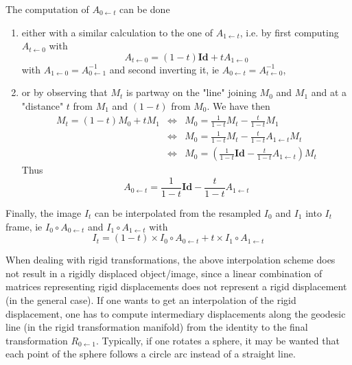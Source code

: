 The computation of $A_{0\leftarrow t}$ can be done 
\begin{enumerate}
\item either with a similar calculation to the one of 
$A_{1 \leftarrow t}$, i.e.
by first computing $A_{t \leftarrow 0}$ with
\begin{displaymath}
A_{t \leftarrow 0} = (1-t) \mathbf{Id} + t A_{1 \leftarrow 0} 
\end{displaymath}
with $A_{1 \leftarrow 0} = A_{0 \leftarrow 1}^{-1}$ and second inverting it, ie $A_{0\leftarrow t} = A_{t \leftarrow 0}^{-1}$,

\item or by observing that
$M_t$ is partway on the "line" joining $M_0$ and $M_1$ and at a "distance" $t$   from $M_1$ and $(1-t)$ from $M_0$. 
We have then
\begin{eqnarray*}
M_t =  (1-t) M_0 + t M_1 
& \Leftrightarrow &
 M_0 = \frac{1}{1-t} M_t - \frac{t}{1-t} M_1 \\
& \Leftrightarrow &
 M_0
 = \frac{1}{1-t} M_t - \frac{t}{1-t} A_{1\leftarrow t} M_t \\
 & \Leftrightarrow &
 M_0
 = \left( \frac{1}{1-t} \mathbf{Id} 
- \frac{t}{1-t} A_{1 \leftarrow t} \right) M_t
\end{eqnarray*}
Thus
\begin{displaymath}
A_{0 \leftarrow t} =  \frac{1}{1-t} \mathbf{Id} 
- \frac{t}{1-t} A_{1 \leftarrow t}
\end{displaymath}

\end{enumerate}


Finally, the image $I_t$ can be interpolated from the resampled $I_0$ and $I_1$ into $I_t$ frame, ie $I_0 \circ A_{0 \leftarrow t}$ and $I_1 \circ A_{1 \leftarrow t}$ with
\begin{displaymath}
I_t = (1-t) \times I_0 \circ A_{0 \leftarrow t}
+ t \times I_1 \circ A_{1 \leftarrow t}
\end{displaymath}

\begin{attention}
When dealing with rigid transformations, the above interpolation scheme does not result in a rigidly displaced object/image, since a linear combination of matrices representing rigid displacements does not represent a rigid displacement (in the general case). If one wants to get an interpolation of the rigid displacement, one has to compute intermediary displacements along the geodesic line (in the rigid transformation manifold) from the identity to the final transformation $R_{0 \leftarrow 1}$. Typically, if one rotates a sphere, it may be wanted that each point of the sphere follows a circle arc instead of a straight line.
\end{attention}

